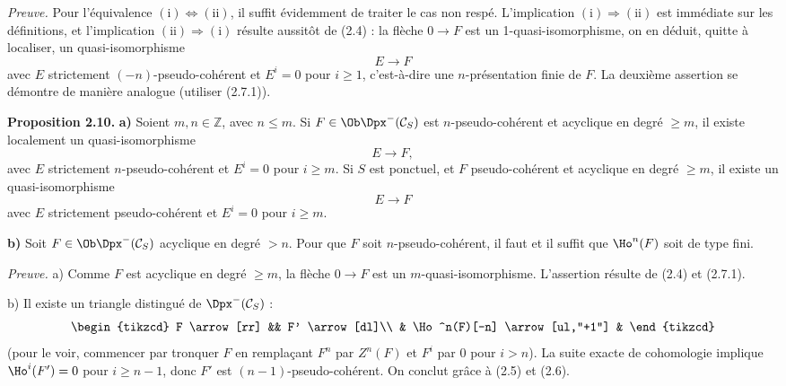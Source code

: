 \documentclass[11pt]{article}
\newcommand{\Spec}{\operatorname{Spec}}
\begin{document}
\emph{Preuve.} Pour l'équivalence \((\mathrm{i})\Leftrightarrow(\mathrm{ii})\), il suffit évidemment de traiter le cas non respé. L'implication \((\mathrm{i})\Rightarrow(\mathrm{ii})\) est immédiate sur les définitions, et l'implication \((\mathrm{ii})\Rightarrow(\mathrm{i})\) résulte aussitôt de (2.4) : la flèche \(0\to F\) est un 1-quasi-isomorphisme, on en déduit, quitte à localiser, un quasi-isomorphisme
\[
  E\longrightarrow F
\]
avec \(E\) strictement \((-n)\)-pseudo-cohérent et \(E^i=0\) pour \(i\geq 1\), c'est-à-dire une \(n\)-présentation finie de \(F\). La deuxième assertion se démontre de manière analogue (utiliser (2.7.1)).

\textbf{Proposition 2.10.} \textbf{a)} Soient \(m,n\in\mathbb Z\), avec \(n\leq m\). Si \(F\in\Ob\Dpx^-(\mathcal C_S)\) est \(n\)-pseudo-cohérent et acyclique en degré \(\geq m\), il existe localement un quasi-isomorphisme
\[
  E\longrightarrow F,
\]
avec \(E\) strictement \(n\)-pseudo-cohérent et \(E^i=0\) pour \(i\geq m\). Si \(S\) est ponctuel, et \(F\) pseudo-cohérent et acyclique en degré \(\geq m\), il existe un quasi-isomorphisme
\[
  E\longrightarrow F
\]
avec \(E\) strictement pseudo-cohérent et \(E^i=0\) pour \(i\geq m\).

\textbf{b)} Soit \(F\in\Ob\Dpx^-(\mathcal C_S)\) acyclique en degré \(>n\). Pour que \(F\) soit \(n\)-pseudo-cohérent, il faut et il suffit que \(\Ho^n(F)\) soit de type fini.

\emph{Preuve.} a) Comme \(F\) est acyclique en degré \(\geq m\), la flèche \(0\to F\) est un \(m\)-quasi-isomorphisme. L'assertion résulte de (2.4) et (2.7.1).

b) Il existe un triangle distingué de \(\Dpx^-(\mathcal C_S)\) :
\[
\begin{tikzcd}
F \arrow[rr] && F' \arrow[dl]\\
& \Ho^n(F)[-n] \arrow[ul,"+1"] &
\end{tikzcd}
\]
(pour le voir, commencer par tronquer \(F\) en remplaçant \(F^n\) par \(Z^n(F)\) et \(F^i\) par \(0\) pour \(i>n\)). La suite exacte de cohomologie implique \(\Ho^i(F')=0\) pour \(i\geq n-1\), donc \(F'\) est \((n-1)\)-pseudo-cohérent. On conclut grâce à (2.5) et (2.6).



\providecommand{\RHom}{\mathrm R\!\Hom}
\providecommand{\Ext}{\operatorname{Ext}}
\providecommand{\coh}{\operatorname{coh}}
\providecommand{\PreCoh}{\operatorname{precoh}}
\providecommand{\Tr}{\operatorname{Tr}}
\providecommand{\Qis}{\operatorname{Qis}}
\providecommand{\Rad}{\operatorname{rad}}
\providecommand{\Spec}{\operatorname{Spec}}
\providecommand{\End}{\operatorname{End}}
\providecommand{\Id}{\operatorname{Id}}
\providecommand{\limdir}{\mathop{\mathrm{lim}}\limits_{\longrightarrow}}
\providecommand{\liminv}{\mathop{\mathrm{lim}}\limits_{\longleftarrow}}
\providecommand{\qcoh}{\operatorname{qcoh}}
\providecommand{\amp}{\operatorname{amp}}
\end{document}
